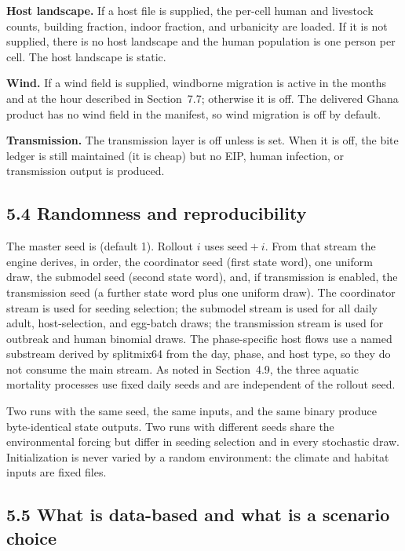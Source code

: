 \documentclass[11pt,a4paper]{article}
\newcommand{\code}[1]{\path{#1}}
\begin{document}
\textbf{Host landscape.} If a host file is supplied, the per-cell human
and livestock counts, building fraction, indoor fraction, and urbanicity
are loaded. If it is not supplied, there is no host landscape and the human
population is one person per cell. The host landscape is static.

\textbf{Wind.} If a wind field is supplied, windborne migration is active
in the months and at the hour described in Section~7.7; otherwise it is
off. The delivered Ghana product has no wind field in the manifest, so
wind migration is off by default.

\textbf{Transmission.} The transmission layer is off unless
\code{--enable-transmission} is set. When it is off, the bite ledger is
still maintained (it is cheap) but no EIP, human infection, or
transmission output is produced.

\subsection*{5.4 Randomness and reproducibility}

The master seed is \code{--seed} (default 1). Rollout $i$ uses
$\text{seed}+i$. From that stream the engine derives, in order, the
coordinator seed (first state word), one uniform draw, the submodel seed
(second state word), and, if transmission is enabled, the transmission
seed (a further state word plus one uniform draw). The coordinator stream is
used for seeding selection; the submodel stream is used for all daily
adult, host-selection, and egg-batch draws; the transmission stream is
used for outbreak and human binomial draws. The phase-specific host
flows use a named substream derived by splitmix64 from the day, phase,
and host type, so they do not consume the main stream. As noted in
Section~4.9, the three aquatic mortality processes use fixed daily seeds
and are independent of the rollout seed.

Two runs with the same seed, the same inputs, and the same binary produce
byte-identical state outputs. Two runs with different seeds share the
environmental forcing but differ in seeding selection and in every
stochastic draw. Initialization is never varied by a random environment:
the climate and habitat inputs are fixed files.

\subsection*{5.5 What is data-based and what is a scenario choice}
\end{document}
